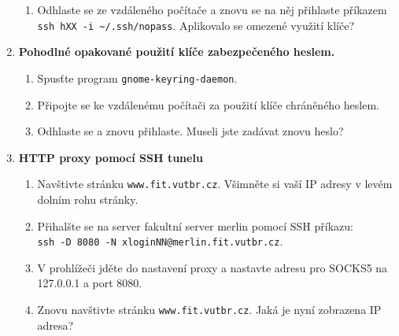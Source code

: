 \begin{enumerate}
\begin{enumerate}
      \item Odhlaste se ze vzdáleného počítače a znovu se na něj přihlaste
        příkazem {\tt ssh hXX -i \textasciitilde/.ssh/nopass}. Aplikovalo se
        omezené využití klíče?

    \end{enumerate}


  \item {\bf Pohodlné opakované použití klíče zabezpečeného heslem.}

    \begin{enumerate}

      \item Spusťte program {\tt gnome-keyring-daemon}.

      \item Připojte se ke vzdálenému počítači za použití klíče chráněného
        heslem.

      \item Odhlaste se a znovu přihlaste. Museli jste zadávat znovu heslo?

    \end{enumerate}

      \item {\bf HTTP proxy pomocí SSH tunelu}

    \begin{enumerate}

      \item Navštivte stránku {\tt www.fit.vutbr.cz}. Všimněte si vaší IP adresy v levém dolním rohu stránky.

      \item Přihalšte se na server fakultní server merlin pomocí SSH příkazu:\\{\tt ssh -D 8080 -N xloginNN@merlin.fit.vutbr.cz}.

      \item V prohlížeči jděte do nastavení proxy a nastavte adresu pro SOCKS5 na 127.0.0.1 a port 8080.

      \item Znovu navštivte stránku {\tt www.fit.vutbr.cz}. Jaká je nyní zobrazena IP adresa?

    \end{enumerate}

\end{enumerate}


